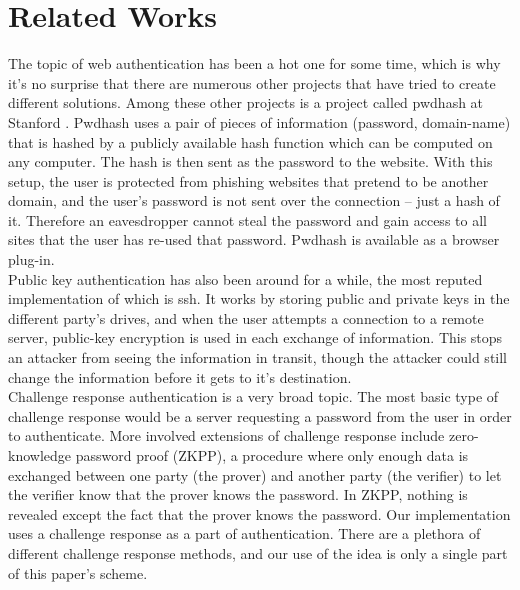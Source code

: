 \documentclass[11pt]{article}
\begin{document}
\section{Related Works} \label{sec:relate}
The topic of web authentication has been a hot one for some time, which is why it's no surprise that there are numerous other projects that have tried to create different solutions.  Among these other projects is a project called pwdhash at Stanford \cite{pwdhash}.  Pwdhash uses a pair of pieces of information (password, domain-name) that is hashed by a publicly available hash function which can be computed on any computer.  The hash is then sent as the password to the website.  With this setup, the user is protected from phishing websites that pretend to be another domain, and the user's password is not sent over the connection – just a hash of it.  Therefore an eavesdropper cannot steal the password and gain access to all sites that the user has re-used that password.  Pwdhash is available as a browser plug-in.\\
Public key authentication has also been around for a while, the most reputed implementation of which is ssh.  It works by storing public and private keys in the different party's drives, and when the user attempts a connection to a remote server, public-key encryption is used in each exchange of information.  This stops an attacker from seeing the information in transit, though the attacker could still change the information before it gets to it's destination.\\
Challenge response authentication is a very broad topic.  The most basic type of challenge response would be a server requesting a password from the user in order to authenticate.  More involved extensions of challenge response include zero-knowledge password proof (ZKPP), a procedure where only enough data is exchanged between one party (the prover) and another party (the verifier) to let the verifier know that the prover knows the password.  In ZKPP, nothing is revealed except the fact that the prover knows the password.  Our implementation uses a challenge response as a part of authentication.  There are a plethora of different challenge response methods, and our use of the idea is only a single part of this paper's scheme.


{}
\end{document}
